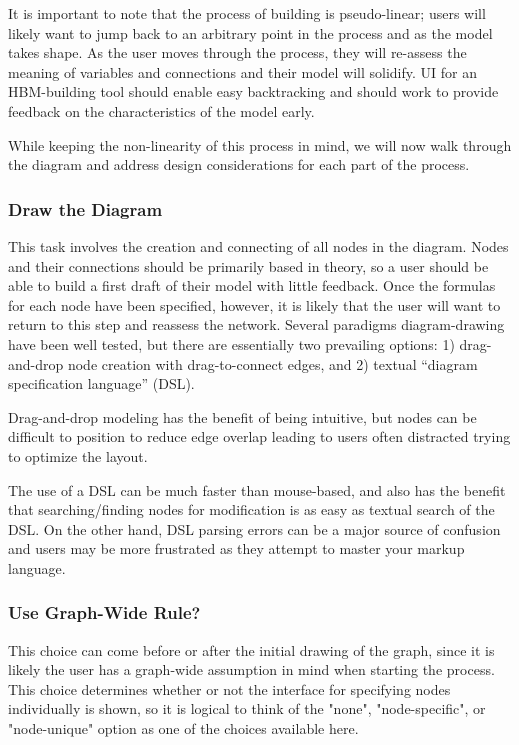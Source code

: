 \documentclass[conference]{IEEEtran}
\begin{document}
It is important to note that the process of building is pseudo-linear; users will likely want to jump back to an arbitrary point in the process and as the model takes shape. 
As the user moves through the process, they will re-assess the meaning of variables and connections and their model will solidify. 
UI for an HBM-building tool should enable easy backtracking and should work to provide feedback on the characteristics of the model early. 

While keeping the non-linearity of this process in mind, we will now walk through the diagram and address design considerations for each part of the process.

\subsubsection{Draw the Diagram}
This task involves the creation and connecting of all nodes in the diagram. 
Nodes and their connections should be primarily based in theory, so a user should be able to build a first draft of their model with little feedback. 
Once the formulas for each node have been specified, however, it is likely that the user will want to return to this step and reassess the network. 
Several paradigms diagram-drawing have been well tested, but there are essentially two prevailing options:
1) drag-and-drop node creation with drag-to-connect edges, and 2) textual ``diagram specification language'' (DSL).

Drag-and-drop modeling has the benefit of being intuitive, but nodes can be difficult to position to reduce edge overlap leading to users often distracted trying to optimize the layout.

The use of a DSL can be much faster than mouse-based, and also has the benefit that searching/finding nodes for modification is as easy as textual search of the DSL.
On the other hand, DSL parsing errors can be a major source of confusion and users may be more frustrated as they attempt to master your markup language.


\subsubsection{Use Graph-Wide Rule?}
This choice can come before or after the initial drawing of the graph, since it is likely the user has a graph-wide assumption in mind when starting the process. 
This choice determines whether or not the interface for specifying nodes individually is shown, so it is logical to think of the "none", "node-specific", or "node-unique" option as one of the choices available here. 
\end{document}
